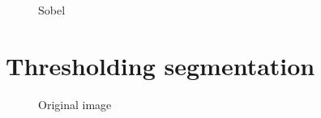     \begin{figure}[!htb]\centering
        \begin{minipage}{0.8\textwidth}
            \caption{\small{Sobel}}\label{diagram:sobel}
        \end{minipage}
    \end{figure}


\section{Thresholding segmentation}

    \begin{figure}[!htb]\centering
        \begin{minipage}{0.6\textwidth}
            \caption{\small{Original image}}\label{diagram:polymersomes}
        \end{minipage}
    \end{figure}

